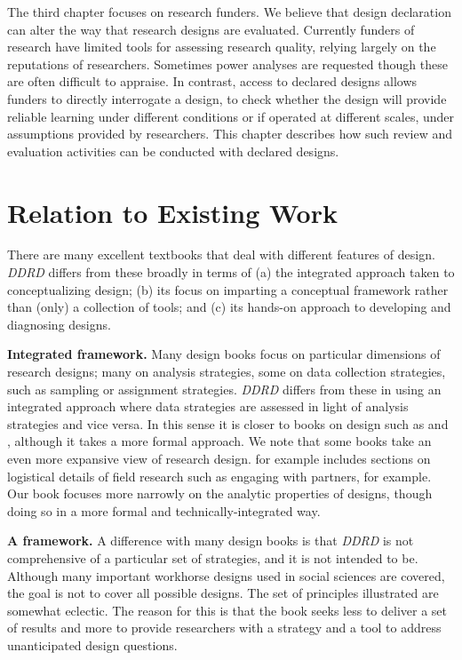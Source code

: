 \documentclass[11pt]{article}
\begin{document}
The third chapter focuses on research funders. We believe that design declaration can alter the way that research designs are evaluated. Currently funders of research have limited tools for assessing  research quality, relying largely on the reputations of researchers. Sometimes power analyses are requested though these are often difficult to appraise. In contrast, access to declared designs allows funders to directly interrogate a design, to check whether the design will provide reliable learning under different conditions or if operated at different scales, under assumptions provided by researchers. This chapter describes how such review and evaluation activities can be conducted with declared designs.

\section{Relation to Existing Work}

There are many excellent textbooks that deal with different features of design. \textit{DDRD} differs from these broadly in terms of (a) the integrated approach taken to conceptualizing design; (b) its focus on imparting a conceptual framework rather than (only) a collection of tools; and (c) its hands-on approach to developing and diagnosing designs.

\textbf{Integrated framework.} Many design books focus on particular dimensions of research designs; many on analysis strategies, some on data collection strategies, such as sampling or assignment strategies. \textit{DDRD} differs from these in using an integrated approach where data strategies are assessed in light of analysis strategies and vice versa. In this sense it is closer to books on design such as \citet{gerring2011social} and \citet{brady2010rethinking}, although it takes a more formal approach. We note that some books take an even more expansive view of research design. \citet{glennerster2013running} for example includes sections on logistical details of field research such as engaging with partners, for example. Our book focuses more narrowly on the analytic properties of designs, though doing so in a more formal and technically-integrated way. 

\textbf{A framework.} A difference with many design books is that \textit{DDRD} is not comprehensive of a particular set of strategies, and it is not intended to be. Although many important workhorse designs used in social sciences are covered, the goal is not to cover all possible designs. The set of principles illustrated are somewhat eclectic. The reason for this is that the book seeks less to deliver a set of results and more to provide researchers with a strategy and a tool to address unanticipated design questions.  
\end{document}
